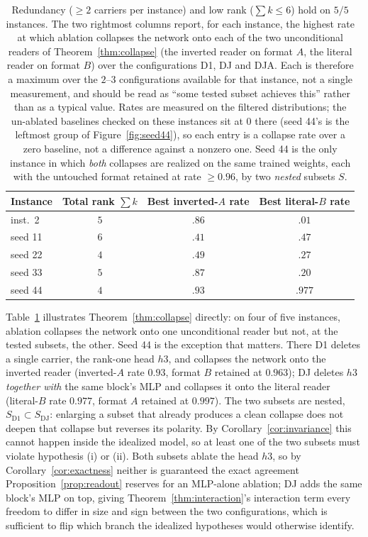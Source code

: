 \documentclass[11pt,a4paper]{article}
\begin{document}
\begin{table}[htbp]
\centering
\small
\begin{tabular}{lccc}
\toprule
Instance & Total rank $\sum k$ & Best inverted-$A$ rate & Best literal-$B$ rate \\
\midrule
inst.\ 2  & $5$ & $.86$ & $.01$ \\
seed 11   & $6$ & $.41$ & $.47$ \\
seed 22   & $4$ & $.49$ & $.27$ \\
seed 33   & $5$ & $.87$ & $.20$ \\
seed 44   & $4$ & $.93$ & $.977$ \\
\bottomrule
\end{tabular}
\caption{Redundancy ($\ge2$ carriers per instance) and low rank ($\sum k\le6$)
hold on $5/5$ instances. The two rightmost columns report, for each instance,
the highest rate at which ablation collapses the network onto each of the two
unconditional readers of Theorem~\ref{thm:collapse} (the inverted reader on
format $A$, the literal reader on format $B$) over the configurations D1,
DJ and DJA. Each is therefore a maximum over the $2$--$3$ configurations
available for that instance, not a single measurement, and should be read as
``some tested subset achieves this'' rather than as a typical value.
Rates are measured on the filtered distributions; the un-ablated
baselines checked on these instances sit at $0$ there (seed 44's is the
leftmost group of Figure~\ref{fig:seed44}), so each entry is a collapse rate
over a zero baseline, not a difference against a nonzero one. Seed 44 is the
only instance in which \emph{both} collapses are realized on the same trained
weights, each with the untouched format retained at rate $\ge0.96$, by two
\emph{nested} subsets $S$.}
\label{tab:results}
\end{table}

Table~\ref{tab:results} illustrates Theorem~\ref{thm:collapse} directly: on
four of five instances, ablation collapses the network onto one unconditional
reader but not, at the tested subsets, the other. Seed 44 is the exception
that matters. There D1 deletes a single carrier, the rank-one head $h3$, and
collapses the network onto the inverted reader (inverted-$A$ rate $0.93$,
format $B$ retained at $0.963$); DJ deletes $h3$ \emph{together with} the same
block's MLP and collapses it onto the literal reader (literal-$B$ rate
$0.977$, format $A$ retained at $0.997$). The two subsets are nested,
$S_{\mathrm{D1}}\subset S_{\mathrm{DJ}}$: enlarging a subset that already
produces a clean collapse does not deepen that collapse but reverses its
polarity. By Corollary~\ref{cor:invariance} this cannot happen inside the
idealized model, so at least one of the two subsets must violate hypothesis
(i) or (ii). Both subsets ablate the head $h3$, so by
Corollary~\ref{cor:exactness} neither is guaranteed the exact agreement
Proposition~\ref{prop:readout} reserves for an MLP-alone ablation; DJ adds
the same block's MLP on top, giving Theorem~\ref{thm:interaction}'s
interaction term every freedom to differ in size and sign between the two
configurations, which is sufficient to flip which branch the idealized
hypotheses would otherwise identify.
\end{document}
